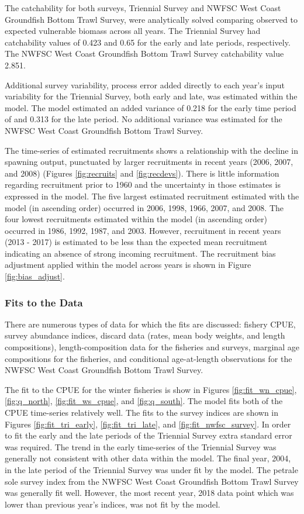 \documentclass[12pt,]{article}
\begin{document}
The catchability for both surveys, Triennial Survey and NWFSC West Coast
Groundfish Bottom Trawl Survey, were analytically solved comparing
observed to expected vulnerable biomass across all years. The Triennial
Survey had catchability values of 0.423 and 0.65 for the early and late
periods, respectively. The NWFSC West Coast Groundfish Bottom Trawl
Survey catchability value 2.851.

Additional survey variability, process error added directly to each
year's input variability for the Triennial Survey, both early and late,
was estimated within the model. The model estimated an added variance of
0.218 for the early time period of and 0.313 for the late period. No
additional variance was estimated for the NWFSC West Coast Groundfish
Bottom Trawl Survey.

The time-series of estimated recruitments shows a relationship with the
decline in spawning output, punctuated by larger recruitments in recent
years (2006, 2007, and 2008) (Figures \ref{fig:recruits} and
\ref{fig:recdevs}). There is little information regarding recruitment
prior to 1960 and the uncertainty in those estimates is expressed in the
model. The five largest estimated recruitment estimated with the model
(in ascending order) occurred in 2006, 1998, 1966, 2007, and 2008. The
four lowest recruitments estimated within the model (in ascending order)
occurred in 1986, 1992, 1987, and 2003. However, recruitment in recent
years (2013 - 2017) is estimated to be less than the expected mean
recruitment indicating an absence of strong incoming recruitment. The
recruitment bias adjustment applied within the model across years is
shown in Figure \ref{fig:bias_adjust}.

\subsubsection{Fits to the Data}\label{fits-to-the-data}

There are numerous types of data for which the fits are discussed:
fishery CPUE, survey abundance indices, discard data (rates, mean body
weights, and length compositions), length-composition data for the
fisheries and surveys, marginal age compositions for the fisheries, and
conditional age-at-length observations for the NWFSC West Coast
Groundfish Bottom Trawl Survey.

The fit to the CPUE for the winter fisheries is show in Figures
\ref{fig:fit_wn_cpue}, \ref{fig:q_north}, \ref{fig:fit_ws_cpue}, and
\ref{fig:q_south}. The model fits both of the CPUE time-series
relatively well. The fits to the survey indices are shown in Figures
\ref{fig:fit_tri_early}, \ref{fig:fit_tri_late}, and
\ref{fig:fit_nwfsc_survey}. In order to fit the early and the late
periods of the Triennial Survey extra standard error was required. The
trend in the early time-series of the Triennial Survey was generally not
consistent with other data within the model. The final year, 2004, in
the late period of the Triennial Survey was under fit by the model. The
petrale sole survey index from the NWFSC West Coast Groundfish Bottom
Trawl Survey was generally fit well. However, the most recent year, 2018
data point which was lower than previous year's indices, was not fit by
the model.
\end{document}
